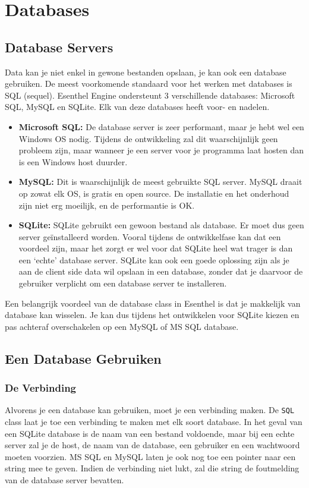 \chapter{Databases}

\section{Database Servers}
Data kan je niet enkel in gewone bestanden opslaan, je kan ook een database gebruiken. De meest voorkomende standaard voor het werken met databases is SQL (sequel). Esenthel Engine ondersteunt 3 verschillende databases: Microsoft SQL, MySQL en SQLite. Elk van deze databases heeft voor- en nadelen.

\begin{itemize}
\item \textbf{Microsoft SQL:} De database server is zeer performant, maar je hebt wel een Windows OS nodig. Tijdens de ontwikkeling zal dit waarschijnlijk geen probleem zijn, maar wanneer je een server voor je programma laat hosten dan is een Windows host duurder.
\item \textbf{MySQL:} Dit is waarschijnlijk de meest gebruikte SQL server. MySQL draait op zowat elk OS, is gratis en open source. De installatie en het onderhoud zijn niet erg moeilijk, en de performantie is OK.
\item \textbf{SQLite:} SQLite gebruikt een gewoon bestand als database. Er moet dus geen server ge\"installeerd worden. Vooral tijdens de ontwikkelfase kan dat een voordeel zijn, maar het zorgt er wel voor dat SQLite heel wat trager is dan een `echte' database server. SQLite kan ook een goede oplossing zijn als je aan de client side data wil opslaan in een database, zonder dat je daarvoor de gebruiker verplicht om een database server te installeren.
\end{itemize}

Een belangrijk voordeel van de database class in Esenthel is dat je makkelijk van database kan wisselen. Je kan dus tijdens het ontwikkelen voor SQLite kiezen en pas achteraf overschakelen op een MySQL of MS SQL database.

\section{Een Database Gebruiken}
\subsection{De Verbinding}
Alvorens je een database kan gebruiken, moet je een verbinding maken. De \texttt{SQL} class laat je toe een verbinding te maken met elk soort database. In het geval van een SQLite database is de naam van een bestand voldoende, maar bij een echte server zal je de host, de naam van de database, een gebruiker en een wachtwoord moeten voorzien. MS SQL en MySQL laten je ook nog toe een pointer naar een string mee te geven. Indien de verbinding niet lukt, zal die string de foutmelding van de database server bevatten.

